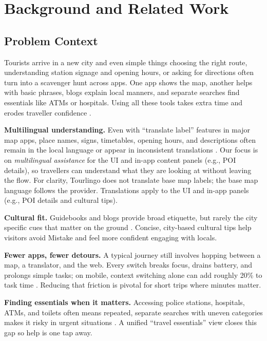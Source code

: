 \chapter{Background and Related Work}
\begin{sloppypar}

\section{Problem Context}
Tourists arrive in a new city and even simple things choosing the right route, understanding station signage and opening hours, or asking for directions often turn into a scavenger hunt across apps. One app shows the map, another helps with basic phrases, blogs explain local manners, and separate searches find essentials like ATMs or hospitals. Using all these tools takes extra time and erodes traveller confidence \cite{mobileit2024}.

\noindent \textbf{Multilingual understanding.}
Even with “translate label” features in major map apps, place names, signs, timetables, opening hours, and descriptions often remain in the local language or appear in inconsistent translations . Our focus is on \emph{multilingual assistance} for the UI and in-app content panels (e.g., POI details), so travellers can understand what they are looking at without leaving the flow. For clarity, Tourlingo does not translate base map labels; the base map language follows the provider. Translations apply to the UI and in-app panels (e.g., POI details and cultural tips).

\medskip

\noindent \textbf{Cultural fit.}
Guidebooks and blogs provide broad etiquette, but rarely the city specific cues that matter on the ground . Concise, city-based cultural tips help visitors avoid Mistake and feel more confident engaging with locals.

\medskip

\noindent \textbf{Fewer apps, fewer detours.}
A typical journey still involves hopping between a map, a translator, and the web. Every switch breaks focus, drains battery, and prolongs simple tasks; on mobile, context switching alone can add roughly 20\% to task time \cite{mobileit2024}. Reducing that friction is pivotal for short trips where minutes matter.

\medskip

\noindent \textbf{Finding essentials when it matters.}
Accessing police stations, hospitals, ATMs, and toilets often means repeated, separate searches with uneven categories makes it risky in urgent situations . A unified “travel essentials” view closes this gap so help is one tap away.


\end{sloppypar}
